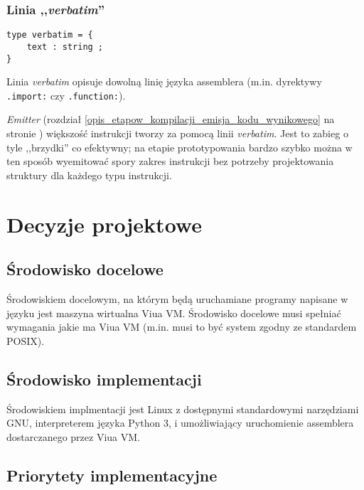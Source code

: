 \subsubsection{Linia ,,\emph{verbatim}''}
\label{diagram_klas_linia_verbatim}

\begin{small}
\begin{lstlisting}
type verbatim = {
    text : string ;
}
\end{lstlisting}
\end{small}

Linia \emph{verbatim} opisuje dowolną linię języka assemblera (m.in. dyrektywy \texttt{.import:} czy
\texttt{.function:}).

\emph{Emitter} (rozdział \ref{opis_etapow_kompilacji_emisja_kodu_wynikowego} na stronie
\pageref{opis_etapow_kompilacji_emisja_kodu_wynikowego}) większość instrukcji tworzy za pomocą linii
\emph{verbatim}. Jest to zabieg o tyle ,,brzydki'' co efektywny; na etapie prototypowania bardzo szybko
można w ten sposób wyemitować spory zakres instrukcji bez potrzeby projektowania struktury dla każdego typu
instrukcji.

\section{Decyzje projektowe}

\subsection{Środowisko docelowe}

Środowiskiem docelowym, na którym będą uruchamiane programy napisane w języku
\ViuAct\phantom{} jest maszyna wirtualna Viua VM. Środowisko docelowe musi
spełniać wymagania jakie ma Viua VM (m.in. musi to być system zgodny ze
standardem POSIX).

\subsection{Środowisko implementacji}

Środowiskiem implmentacji jest Linux z dostępnymi standardowymi narzędziami GNU,
interpreterem języka Python 3, i umożliwiający uruchomienie assemblera
dostarczanego przez Viua VM.

\subsection{Priorytety implementacyjne}

